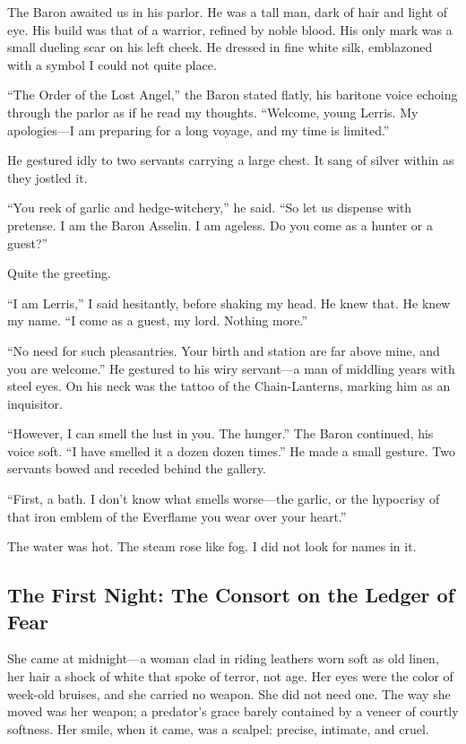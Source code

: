 \documentclass[11pt]{article}
\begin{document}
The Baron awaited us in his parlor. He was a tall man, dark of hair and light of eye. His build was that of a warrior, refined by noble blood. His only mark was a small dueling scar on his left cheek. He dressed in fine white silk, emblazoned with a symbol I could not quite place.

``The Order of the Lost Angel,'' the Baron stated flatly, his baritone voice echoing through the parlor as if he read my thoughts. ``Welcome, young Lerris. My apologies---I am preparing for a long voyage, and my time is limited.''

He gestured idly to two servants carrying a large chest. It sang of silver within as they jostled it.

``You reek of garlic and hedge-witchery,'' he said. ``So let us dispense with pretense. I am the Baron Asselin. I am ageless. Do you come as a hunter or a guest?''

Quite the greeting.

``I am Lerris,'' I said hesitantly, before shaking my head. He knew that. He knew my name. ``I come as a guest, my lord. Nothing more.''

``No need for such pleasantries. Your birth and station are far above mine, and you are welcome.'' He gestured to his wiry servant---a man of middling years with steel eyes. On his neck was the tattoo of the Chain-Lanterns, marking him as an inquisitor.

``However, I can smell the lust in you. The hunger.'' The Baron continued, his voice soft. ``I have smelled it a dozen dozen times.'' He made a small gesture. Two servants bowed and receded behind the gallery.

``First, a bath. I don't know what smells worse---the garlic, or the hypocrisy of that iron emblem of the Everflame you wear over your heart.''

The water was hot. The steam rose like fog. I did not look for names in it.

\newpage

\subsection*{The First Night: The Consort on the Ledger of Fear}

She came at midnight---a woman clad in riding leathers worn soft as old linen, her hair a shock of white that spoke of terror, not age. Her eyes were the color of week-old bruises, and she carried no weapon. She did not need one. The way she moved was her weapon; a predator's grace barely contained by a veneer of courtly softness. Her smile, when it came, was a scalpel: precise, intimate, and cruel.
\end{document}
